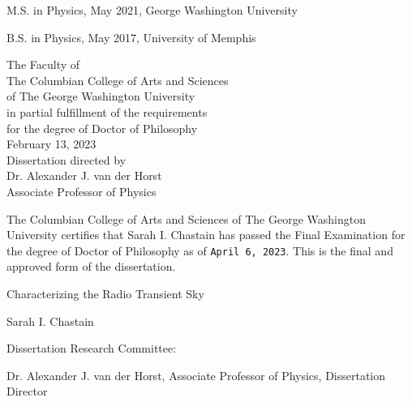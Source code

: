 \documentclass[12pt]{article}
\begin{document}
\thispagestyle{empty}
\vspace*{1in}
\begin{center}
\centerline{M.S. in Physics, May 2021, George Washington University}
\centerline{B.S. in Physics, May 2017, University of Memphis}\vspace*{24pt}
\begin{center}
The Faculty of\\The Columbian College of Arts and Sciences \\ of The George
Washington University\\ in partial fulfillment of the requirements\\ for the degree
of Doctor of Philosophy\\[36pt]
February 13, 2023\\[36pt] %
Dissertation directed by\\[\baselineskip]
Dr. Alexander J. van der Horst\\
Associate Professor of Physics\\[\baselineskip]
\end{center}
\end{center}
\pagestyle{plain}
\setcounter{page}{1}
\newpage
\begin{doublespace}
\noindent
The Columbian College of Arts and Sciences of The George Washington University certifies that Sarah I. Chastain has passed the Final Examination for the degree of Doctor of Philosophy as of \texttt{April 6, 2023}. This is the final and approved form of the dissertation.
\end{doublespace}
\vspace{12pt}
\begin{center}
Characterizing the Radio Transient Sky

\vspace*{36pt}
Sarah I. Chastain
\vspace{24pt}
\end{center}
Dissertation Research Committee:
\vspace{12pt}

\indent Dr. Alexander J. van der Horst, Associate Professor of Physics, Dissertation Director
\vspace{12pt}
\end{document}
